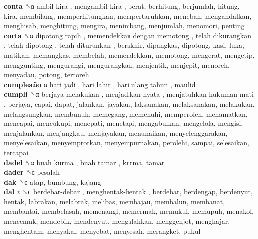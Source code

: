 \textbf{conta} ␝α   ambil kira ,  mengambil kira , berat, berhitung, berjumlah, hitung, kira, membilang, memperhitungkan, mempertaruhkan, meneban, mengandalkan, menghisab, menghitung, mengira, menimbang, menjumlah, menomori, penting  \\
\textbf{corta} ␝α   dipotong rapih ,  memendekkan dengan memotong ,  telah dikurangkan ,  telah dipotong ,  telah diturunkan , berakhir, dipangkas, dipotong, kasi, luka, matikan, memangkas, membelah, memendekkan, memotong, mengerat, mengetip, menggunting, mengurangi, mengurangkan, menjentik, menjepit, menoreh, menyadau, potong, tertoreh  \\
\textbf{cumpleaño} α   hari jadi ,  hari lahir ,  hari ulang tahun , maulid  \\
\textbf{cumpli} ␝α   berjaya melakukan ,  menjadikan nyata ,  menjatuhkan hukuman mati , berjaya, capai, dapat, jalankan, jayakan, laksanakan, melaksanakan, melakukan, melangsungkan, membunuh, memegang, memenuhi, memperoleh, menamatkan, mencapai, mencukupi, menepati, menetapi, mengabulkan, mengelola, mengisi, menjalankan, menjangkau, menjayakan, menunaikan, menyelenggarakan, menyelesaikan, menyemprotkan, menyempurnakan, perolehi, sampai, selesaikan, tercapai  \\
\textbf{dadel} ␝α   buah kurma ,  buah tamar , kurma, tamar  \\
\textbf{dader} ␝ϲ  pesalah  \\
\textbf{dak} ␝ϲ  atap, bumbung, kajang  \\
\textbf{dal} \emph{v}  ␝ϲ   berdebar-debar ,  menghentak-hentak , berdebar, berdengap, berdenyut, hentak, labrakan, melabrak, melibas, membajau, membalun, membanat, membantai, membelasah, memenangi, memermak, memukul, memupuh, menakol, mencemuk, mendebik, mendenyut, mengalahkan, menggenjot, menghajar, menghentam, menyakal, menyebat, menyesah, merangket, pukul  \\

